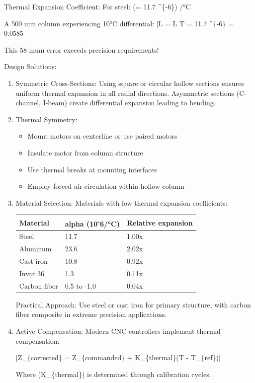 \documentclass[
]{article}
\providecommand{\tightlist}{%
  \setlength{\itemsep}{0pt}\setlength{\parskip}{0pt}}
\begin{document}
Thermal Expansion Coefficient: For steel: (\alpha = 11.7
\^{}\{-6\}) /°C

A 500 mm column experiencing 10°C differential: {[}\Delta L = \alpha L
\Delta T = 11.7 \^{}\{-6\}   = 0.0585
\text{ mm}{]}

This 58 mum error exceeds precision requirements!

Design Solutions:

\begin{enumerate}
\def\labelenumi{\arabic{enumi}.}
\item
  Symmetric Cross-Sections: Using square or circular hollow sections
  ensures uniform thermal expansion in all radial directions. Asymmetric
  sections (C-channel, I-beam) create differential expansion leading to
  bending.
\item
  Thermal Symmetry:

  \begin{itemize}
  \tightlist
  \item
    Mount motors on centerline or use paired motors
  \item
    Insulate motor from column structure
  \item
    Use thermal breaks at mounting interfaces
  \item
    Employ forced air circulation within hollow column
  \end{itemize}
\item
  Material Selection: Materials with low thermal expansion coefficients:

  {\def\LTcaptype{} %
  \begin{longtable}[]{@{}lll@{}}
  \toprule\noalign{}
  Material & alpha (10\textsuperscript{-}6/°C) & Relative expansion \\
  \midrule\noalign{}
  \endhead
  \bottomrule\noalign{}
  \endlastfoot
  Steel & 11.7 & 1.00x \\
  Aluminum & 23.6 & 2.02x \\
  Cast iron & 10.8 & 0.92x \\
  Invar 36 & 1.3 & 0.11x \\
  Carbon fiber & 0.5 to -1.0 & 0.04x \\
  \end{longtable}
  }

  Practical Approach: Use steel or cast iron for primary structure, with
  carbon fiber composite in extreme precision applications.
\item
  Active Compensation: Modern CNC controllers implement thermal
  compensation:

  {[}Z\_\{corrected\} = Z\_\{commanded\} + K\_\{thermal\}(T -
  T\_\{ref\}){]}

  Where (K\_\{thermal\}) is determined through calibration cycles.
\end{enumerate}
\end{document}
